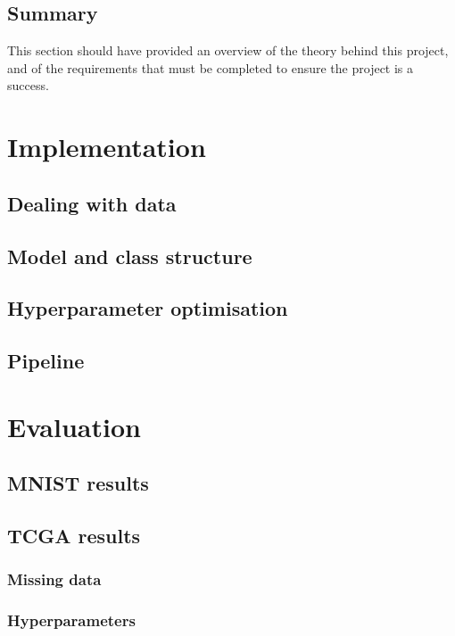 \documentclass[12pt,a4paper,twoside,openright]{report}
\begin{document}
\section{Summary}

This section should have provided an overview of the theory behind this project, and of the requirements that must be completed to 
ensure the project is a success.

\chapter{Implementation}

\section{Dealing with data}

\section{Model and class structure}

\section{Hyperparameter optimisation}

\section{Pipeline}

\chapter{Evaluation}

\section{MNIST results}

\section{TCGA results}

\subsection{Missing data}

\subsection{Hyperparameters}
\end{document}
